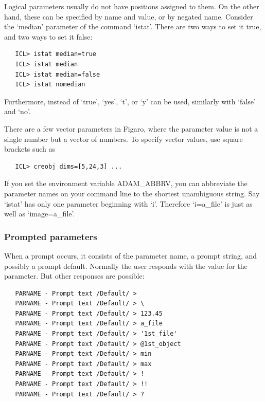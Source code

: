 \documentclass[11pt,twoside]{article}
\begin{document}
   Logical parameters usually do not have positions assigned to them. On
   the other hand, these can be specified by name and value, or by
   negated name. Consider the `median' parameter of the command
   `istat'. There are two ways to set it true, and two ways to set it
   false:

\begin{verbatim}
   ICL> istat median=true
   ICL> istat median
   ICL> istat median=false
   ICL> istat nomedian
\end{verbatim}

   Furthermore, instead of `true', `yes', `t', or `y' can be
   used, similarly with `false' and `no'.

   There are a few vector parameters in Figaro, where the parameter
   value is not a single number but a vector of numbers. To specify
   vector values, use square brackets such as

\begin{verbatim}
   ICL> creobj dims=[5,24,3] ...
\end{verbatim}

   If you set the environment variable ADAM\_ABBRV, you can abbreviate
   the parameter names on your command line to the shortest unambiguous
   string. Say `istat' has only one parameter beginning with `i'. Therefore
   `i=a\_file' is just as well as `image=a\_file'.


\subsubsection{\label{paramsprompt}Prompted parameters}

   When a prompt occurs, it consists of the parameter name, a prompt
   string, and possibly a prompt default. Normally the user responds
   with the value for the parameter. But other responses are possible:

\begin{verbatim}
   PARNAME - Prompt text /Default/ >
   PARNAME - Prompt text /Default/ > \
   PARNAME - Prompt text /Default/ > 123.45
   PARNAME - Prompt text /Default/ > a_file
   PARNAME - Prompt text /Default/ > '1st_file'
   PARNAME - Prompt text /Default/ > @1st_object
   PARNAME - Prompt text /Default/ > min
   PARNAME - Prompt text /Default/ > max
   PARNAME - Prompt text /Default/ > !
   PARNAME - Prompt text /Default/ > !!
   PARNAME - Prompt text /Default/ > ?
\end{verbatim}
\end{document}

